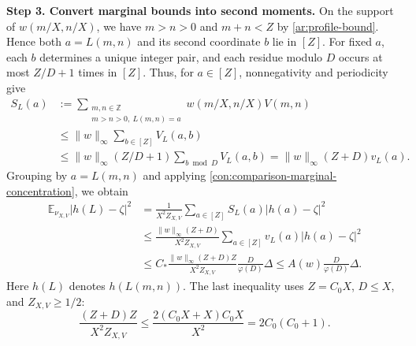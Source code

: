 \documentclass[twoside]{aomart}
\makeatletter
\theoremstyle{paperplain}
\theoremstyle{paperdefinition}
\renewenvironment{proof}[1][\proofname]{\par\pushQED{\qed}%
  \normalfont\topsep6\p@\@plus3\p@\relax\trivlist
  \item[\hskip\labelsep\itshape #1\@addpunct{.}]\ignorespaces
}{\popQED\endtrivlist\@endpefalse}
\newcommand{\E}{\mathbb E}
\newcommand{\Z}{\mathbb Z}
\numberwithin{equation}{section}
\makeatother
\begin{document}
\begin{proof}
\medskip
\noindent\textbf{Step 3. Convert marginal bounds into second moments.}
On the support of $w(m/X,n/X)$, we have $m>n>0$ and
$m+n<Z$ by \eqref{ar:profile-bound}.
Hence both $a=L(m,n)$ and its second coordinate $b$ lie in $[Z]$.
For fixed $a$, each $b$ determines a unique integer pair, and each
residue modulo $D$ occurs at most $Z/D+1$ times in $[Z]$.
Thus, for $a\in[Z]$, nonnegativity and periodicity give
\begin{equation*}
 \begin{aligned}
 S_L(a)&:=\sum_{\substack{m,n\in\Z\\m>n>0,\ L(m,n)=a}}
                 w(m/X,n/X)V(m,n)\\
 &\le\|w\|_\infty\sum_{b\in[Z]}V_L(a,b)\\
 &\le\|w\|_\infty(Z/D+1)\sum_{b\bmod D}V_L(a,b)
 =\|w\|_\infty(Z+D)v_L(a).
 \end{aligned}
 \end{equation*}
Grouping by $a=L(m,n)$ and applying
\eqref{con:comparison-marginal-concentration}, we obtain
\begin{equation}
 \begin{aligned}
 \E_{\nu_{X,V}}|h(L)-\zeta|^2
 &=\frac1{X^2Z_{X,V}}\sum_{a\in[Z]}S_L(a)|h(a)-\zeta|^2\\
 &\le\frac{\|w\|_\infty(Z+D)}{X^2Z_{X,V}}
                \sum_{a\in[Z]}v_L(a)|h(a)-\zeta|^2\\
 &\le C_*\frac{\|w\|_\infty(Z+D)Z}{X^2Z_{X,V}}
                \frac D{\varphi(D)}\Delta
 \le A(w)\frac D{\varphi(D)}\Delta.
 \end{aligned}
 \label{con:comparison-second-moments}
\end{equation}
Here $h(L)$ denotes $h(L(m,n))$.
The last inequality uses $Z=C_0X$, $D\le X$, and $Z_{X,V}\ge1/2$:
\begin{equation*}
 \frac{(Z+D)Z}{X^2Z_{X,V}}
 \le\frac{2(C_0X+X)C_0X}{X^2}=2C_0(C_0+1).
 \end{equation*}


\end{proof}
\end{document}
